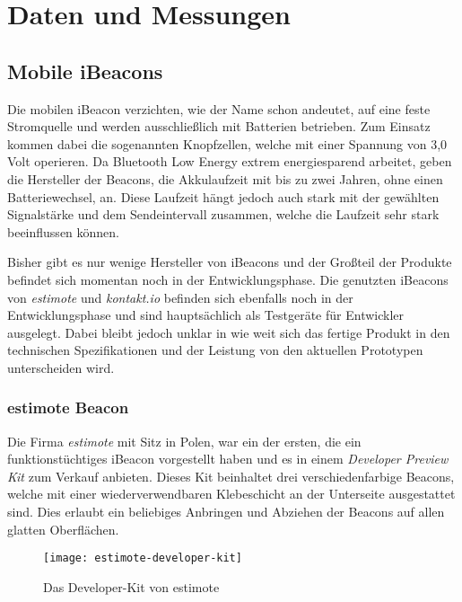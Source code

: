 \chapter{Daten und Messungen}
\label{chap:dataandmeasure}

\section{Mobile iBeacons}
\label{sec:dataandmeasurement:mobilebeacon}
Die mobilen iBeacon verzichten, wie der Name schon andeutet, auf eine feste Stromquelle und werden ausschließlich mit Batterien betrieben.
Zum Einsatz kommen dabei die sogenannten Knopfzellen, welche mit einer Spannung von 3,0 Volt operieren.
Da Bluetooth Low Energy extrem energiesparend arbeitet, geben die Hersteller der Beacons, die Akkulaufzeit mit bis zu zwei Jahren, ohne einen Batteriewechsel, an. Diese Laufzeit hängt jedoch auch stark mit der gewählten Signalstärke und dem Sendeintervall zusammen, welche die Laufzeit sehr stark beeinflussen können.

Bisher gibt es nur wenige Hersteller von iBeacons und der Großteil der Produkte befindet sich momentan noch in der Entwicklungsphase. Die genutzten iBeacons von \emph{estimote} und \emph{kontakt.io} befinden sich ebenfalls noch in der Entwicklungsphase und sind hauptsächlich als Testgeräte für Entwickler ausgelegt. Dabei bleibt jedoch unklar in wie weit sich das fertige Produkt in den technischen Spezifikationen und der Leistung von den aktuellen Prototypen unterscheiden wird.

\subsection{estimote Beacon}
\label{sec:dataandmeasurement:mobilebeacon:estimote}
Die Firma \emph{estimote} mit Sitz in Polen, war ein der ersten, die ein funktionstüchtiges iBeacon vorgestellt haben und es in einem \emph{Developer Preview Kit} zum Verkauf anbieten.
Dieses Kit beinhaltet drei verschiedenfarbige Beacons, welche mit einer wiederverwendbaren Klebeschicht an der Unterseite ausgestattet sind. Dies erlaubt ein beliebiges Anbringen und Abziehen der Beacons auf allen glatten Oberflächen.
\begin{figure}[htb!]
		\centering
	\texttt{[image: estimote-developer-kit]}
	\caption{Das Developer-Kit von estimote}
	\label{estimote-developer-kit}
\end{figure}

